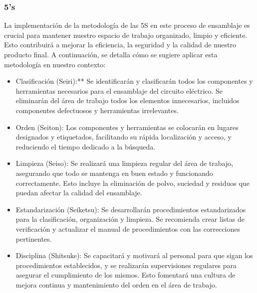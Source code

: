     \subsubsection{5's}
     
    La implementación de la metodología de las 5S en este proceso de ensamblaje es crucial para mantener nuestro espacio de trabajo organizado, limpio y eficiente. Esto contribuirá a mejorar la eficiencia, la seguridad y la calidad de nuestro producto final. A continuación, se detalla cómo se sugiere aplicar esta metodología en nuestro contexto:
    \begin{itemize}
    
    \item Clasificación (Seiri):** Se identificarán y clasificarán todos los componentes y herramientas necesarios para el ensamblaje del circuito eléctrico. Se eliminarán del área de trabajo todos los elementos innecesarios, incluidos componentes defectuosos y herramientas irrelevantes.
    
     \item Orden (Seiton): Los componentes y herramientas se colocarán en lugares designados y etiquetados, facilitando su rápida localización y acceso, y reduciendo el tiempo dedicado a la búsqueda.
    
    \item Limpieza (Seiso): Se realizará una limpieza regular del área de trabajo, asegurando que todo se mantenga en buen estado y funcionando correctamente. Esto incluye la eliminación de polvo, suciedad y residuos que puedan afectar la calidad del ensamblaje.
    
     \item Estandarización (Seiketsu): Se desarrollarán procedimientos estandarizados para la clasificación, organización y limpieza. Se recomienda crear listas de verificación y actualizar el manual de procedimientos con las correcciones pertinentes.
    
     \item Disciplina (Shitsuke): Se capacitará y motivará al personal para que sigan los procedimientos establecidos, y se realizarán supervisiones regulares para asegurar el cumplimiento de los mismos. Esto fomentará una cultura de mejora continua y mantenimiento del orden en el área de trabajo.
    \end{itemize}
    
    
